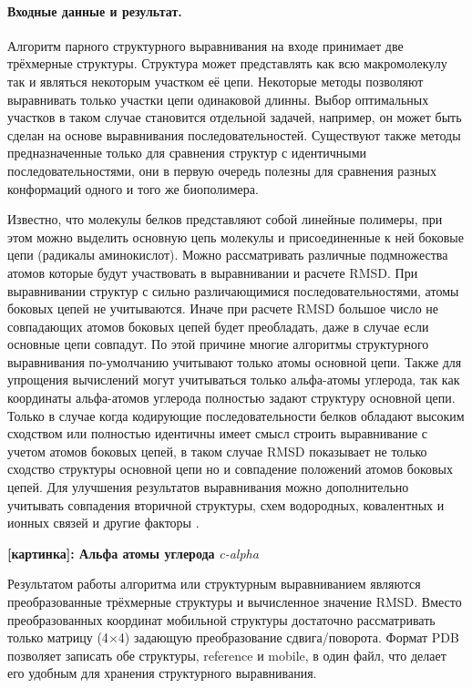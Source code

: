 \documentclass[a4paper, 12pt, titlepage, utf8]{extarticle}
\newcommand{\myimage}[2]{   
    \begin{center} \textbf{[картинка]: #1} \textit{#2} \end{center} 
}
\begin{document}
\paragraph{Входные данные и результат.}
Алгоритм парного структурного выравнивания на входе принимает две трёхмерные структуры. Структура может представлять как всю макромолекулу так и являться некоторым участком её цепи. Некоторые методы позволяют выравнивать только участки цепи одинаковой длинны. Выбор оптимальных участков в таком случае становится отдельной задачей, например, он может быть сделан на основе выравнивания последовательностей. Существуют также методы предназначенные только для сравнения структур с идентичными последовательностями, они в первую очередь полезны для сравнения разных конформаций одного и того же биополимера. 

Известно, что молекулы белков представляют собой линейные полимеры, при этом можно выделить основную цепь молекулы и присоединенные к ней боковые цепи (радикалы аминокислот). Можно рассматривать различные подмножества атомов которые будут участвовать в выравнивании и расчете RMSD. При выравнивании структур с сильно различающимися последовательностями, атомы боковых цепей не учитываются. Иначе при расчете RMSD большое число не совпадающих атомов боковых цепей будет преобладать, даже в случае если основные цепи совпадут. По этой причине многие алгоритмы структурного выравнивания по-умолчанию учитывают только атомы основной цепи. Также для упрощения вычислений могут учитываться только альфа-атомы углерода, так как координаты альфа-атомов углерода полностью задают структуру основной цепи. Только в случае когда кодирующие последовательности белков обладают высоким сходством или полностью идентичны имеет смысл строить выравнивание с учетом атомов боковых цепей, в таком случае RMSD показывает не только сходство структуры основной цепи но и совпадение положений атомов боковых цепей. Для улучшения результатов выравнивания можно дополнительно учитывать совпадения вторичной структуры, схем водородных, ковалентных и ионных связей и другие факторы \cite{wiki-3}. 

\myimage{Альфа атомы углерода}{c-alpha}

Результатом работы алгоритма или структурным выравниванием являются преобразованные трёхмерные структуры и вычисленное значение RMSD. Вместо преобразованных координат мобильной структуры достаточно рассматривать только матрицу (4$\times$4) задающую преобразование сдвига/поворота. Формат PDB позволяет записать обе структуры, reference и mobile, в один файл, что делает его удобным для хранения структурного выравнивания.
\end{document}
